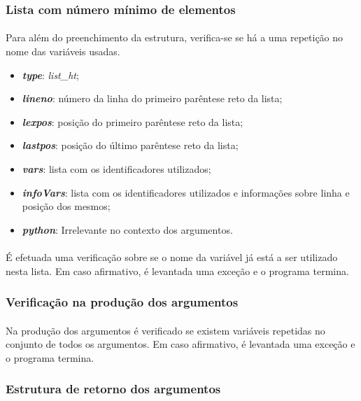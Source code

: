 \documentclass[11pt,a4paper]{report}
\begin{document}
\subsubsection{Lista com número mínimo de elementos}
\paragraph*{}
Para além do preenchimento da estrutura, verifica-se se há a uma repetição no nome das variáveis usadas.

\begin{itemize}
  \item \textit{\textbf{type}}: \textit{list\_ht};
  \item \textit{\textbf{lineno}}: número da linha do primeiro parêntese reto da lista;
  \item \textit{\textbf{lexpos}}: posição do primeiro parêntese reto da lista;
  \item \textit{\textbf{lastpos}}: posição do último parêntese reto da lista;
  \item \textit{\textbf{vars}}: lista com os identificadores utilizados;
  \item \textit{\textbf{infoVars}}: lista com os identificadores utilizados e informações sobre linha e posição dos mesmos;
  \item \textit{\textbf{python}}: Irrelevante no contexto dos argumentos.
\end{itemize}

\paragraph*{}
É efetuada uma verificação sobre se o nome da variável já está a ser utilizado nesta lista. Em caso afirmativo, é levantada uma exceção e o programa termina.

\subsubsection{Verificação na produção dos argumentos}
\paragraph*{}
Na produção dos argumentos é verificado se existem variáveis repetidas no conjunto de todos os argumentos. Em caso afirmativo, é levantada uma exceção e o programa termina.

\subsubsection{Estrutura de retorno dos argumentos}
\end{document}
